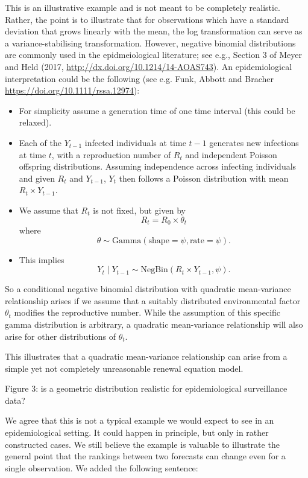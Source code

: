 \documentclass{article}
\newcommand{\black}{\color{black}}
\newcommand{\blue}{\color{blue}}
\begin{document}
\black
This is an illustrative example and is not meant to be completely realistic. Rather, the point is to illustrate that for observations which have a standard deviation that grows linearly with the mean, the log transformation can serve as a variance-stabilising transformation. However, negative binomial distributions are commonly used in the epidmeiological literature; see e.g., Section 3 of Meyer and Held (2017, \url{http://dx.doi.org/10.1214/14-AOAS743}). An epidemiological interpretation could be the following (see e.g. Funk, Abbott and Bracher \url{https://doi.org/10.1111/rssa.12974}):
\begin{itemize}
    \item For simplicity assume a generation time of one time interval (this could be relaxed).
    \item Each of the $Y_{t - 1}$ infected individuals at time $t - 1$  generates new infections at time $t$, with a reproduction number of $R_t$ and independent Poisson offspring distributions. Assuming independence across infecting individuals and given $R_t$ and $Y_{t - 1}$, $Y_t$ then follows a Poisson distribution with mean $R_t \times Y_{t - 1}$.
    \item We assume that $R_t$ is not fixed, but given by
    $$
    R_t = R_0 \times \theta_t
    $$
    where
    $$
    \theta \sim \text{Gamma}(\text{shape} = \psi, \text{rate} = \psi).
    $$
    \item This implies
    $$
    Y_t \mid Y_{t - 1} \sim \text{NegBin}(R_t \times Y_{t - 1}, \psi).
    $$
\end{itemize}
So a conditional negative binomial distribution with quadratic mean-variance relationship arises if we assume that a suitably distributed environmental factor $\theta_t$ modifies the reproductive number. While the assumption of this specific gamma distribution is arbitrary, a quadratic mean-variance relationship will also arise for other distributions of $\theta_t$.

This illustrates that a quadratic mean-variance relationship can arise from a simple yet not completely unreasonable renewal equation model.

\blue
Figure 3: is a geometric distribution realistic for epidemiological surveillance data?

\black
We agree that this is not a typical example we would expect to see in an epidemiological setting. It could happen in principle, but only in rather constructed cases. We still believe the example is valuable to illustrate the general point that the rankings between two forecasts can change even for a single observation. We added the following sentence:
\end{document}

